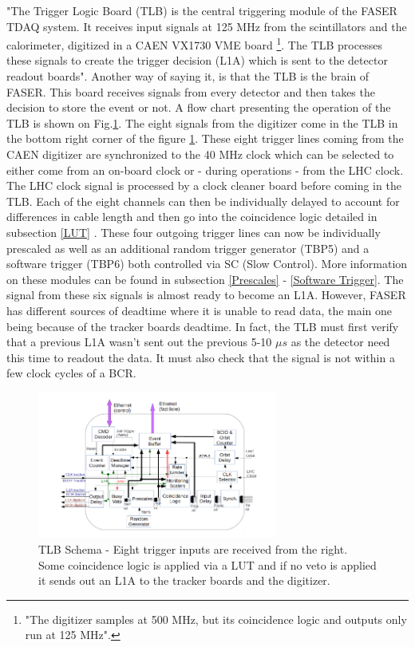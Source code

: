 "The Trigger Logic Board (TLB) is the central triggering module of the FASER TDAQ system. It
receives input signals at 125 MHz from the scintillators and the calorimeter, digitized in a CAEN VX1730 VME board \footnote{"The digitizer samples at 500 MHz, but its coincidence logic and outputs only run at 125 MHz"\cite{debieux_trigger_2019}.}. The TLB processes these signals to create the trigger decision (L1A) which is sent to the detector readout boards"\cite{debieux_trigger_2019}. Another way of saying it, is that the TLB is the brain of FASER. This board receives signals from every detector and then takes the decision to store the event or not. A flow chart presenting the operation of the TLB is shown on Fig.\ref{fig:TLBSchema}. The eight signals from the digitizer come in the TLB in the bottom right corner of the figure \ref{fig:TLBSchema}. These eight trigger lines coming from the CAEN digitizer are synchronized to the 40 MHz clock which can be selected to either come from an on-board clock or - during operations - from the LHC clock. The LHC clock signal is processed by a clock cleaner board before coming in the TLB. Each of the eight channels can then be individually delayed to account for differences in cable length and then go into the coincidence logic detailed in subsection \ref{LUT} . These four outgoing trigger lines can now be individually prescaled as well as an additional random trigger generator (TBP5) and a software trigger (TBP6) both controlled via SC (Slow Control). More information on these modules can be found in subsection \ref{Prescales} - \ref{Software Trigger}. The signal from these six signals is almost ready to become an L1A. However, FASER has different sources of deadtime where it is unable to read data, the main one being because of the tracker boards deadtime. In fact, the TLB must first verify that a previous L1A wasn't sent out the previous 5-10 $\mu s$ as the detector need this time to readout the data. It must also check that the signal is not within a few clock cycles of a BCR.


\begin{figure}[htbp!] 
\centering    
\includegraphics[width=0.7\textwidth]{TLBSchema.png}
\caption[TLB Schema]{TLB Schema - Eight trigger inputs are received from the right. Some coincidence logic is applied via a LUT and if no veto is applied it sends out an L1A to the tracker boards and the digitizer.}
\label{fig:TLBSchema}
\end{figure}

